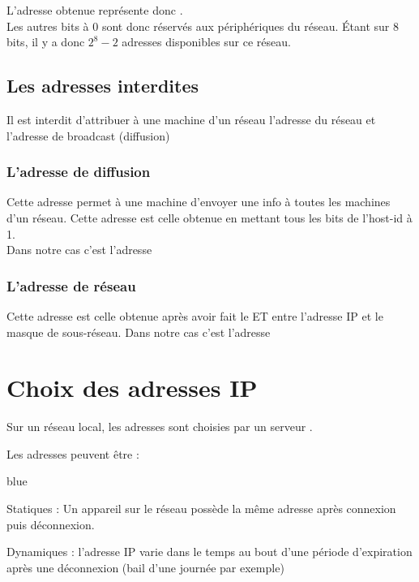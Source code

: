 {\begin{solution}
L'adresse  obtenue représente donc .\\

Les autres bits à 0 sont donc réservés aux périphériques du réseau. Étant sur 8 bits, il y a donc $2^8-2$ adresses 
disponibles sur ce réseau.

\end{solution}


\subsection{Les adresses interdites}

Il est interdit d’attribuer à une machine d’un réseau l’adresse du réseau et l’adresse de broadcast (diffusion)

\subsubsection{L'adresse de diffusion}

Cette adresse permet à une machine d’envoyer une info à toutes les machines d’un réseau. 
Cette adresse est celle obtenue en mettant tous les bits de l’host-id à 1. \\
Dans notre cas c'est l'adresse 

\subsubsection{L'adresse de réseau}

Cette adresse est celle obtenue après avoir fait le ET entre l'adresse IP et le masque de sous-réseau.
Dans notre cas c'est l'adresse 


\section{Choix des adresses IP}


Sur un réseau local, les adresses sont choisies par un serveur .

Les adresses peuvent être :

\begin{items}{blue}{\Bullet}
	\item Statiques : Un appareil sur le réseau possède la même adresse après connexion puis déconnexion.
	\item Dynamiques : l'adresse IP varie dans le temps au bout d'une période d'expiration après une déconnexion 
	(bail d'une journée par exemple)
\end{items}

}
